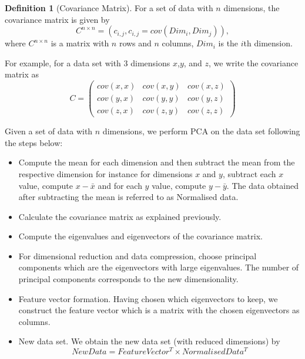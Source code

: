 \documentclass[10pt,a4paper]{article}
\theoremstyle{plain}
\theoremstyle{definition}
\newtheorem{defn}[subsection]{Definition}
\begin{document}
       \begin{defn}[Covariance Matrix]
       	For a set of data with $n$ dimensions, the covariance matrix is given by
       	\begin{equation}
       	C^{n \times n} = (c_{i,j}, c_{i,j} = cov(Dim_i, Dim_j)),
       	\end{equation}
       	where $C^{n \times n}$ is a matrix with $n$ rows and $n$ columns, $Dim_i$ is the $i$th dimension. 
       \end{defn}
       For example, for a data set with $3$ dimensions $x$,$y$, and $z$, we write the covariance matrix as
       \begin{equation}
       C = \begin{pmatrix}
       cov(x,x) & cov(x,y) & cov(x,z) \\
       cov(y,x) & cov(y,y) & cov(y,z) \\
       cov(z,x) & cov(z,y) & cov(z,z)
       \end{pmatrix}
       \end{equation}
       
       Given a set of data with $n$ dimensions, we perform PCA on the data set following the steps below:
       \begin{itemize}
       	\item Compute the mean for each dimension and then subtract the mean from the respective dimension for instance for dimensions $x$ and $y$, subtract each $x$ value, compute $x-\bar{x}$ and for each $y$ value, compute $y-\bar{y}$. The data obtained after subtracting the mean is referred to as Normalised data.
       	\item Calculate the covariance matrix as explained previously.
       	\item Compute the eigenvalues and eigenvectors of the covariance matrix.
       	\item For dimensional reduction and data compression, choose principal components which are the eigenvectors with large eigenvalues. The number of principal components corresponds to the new dimensionality.
       	\item Feature vector formation. Having chosen which eigenvectors to keep, we construct the feature vector which is a matrix with the chosen eigenvectors as columns.
       	\item New data set. We obtain the new data set (with reduced dimensions) by 
       	 \begin{equation}
       	 NewData = FeatureVector^T \times NormalisedData^T
       	 \end{equation}
       	
       \end{itemize}
\end{document}
